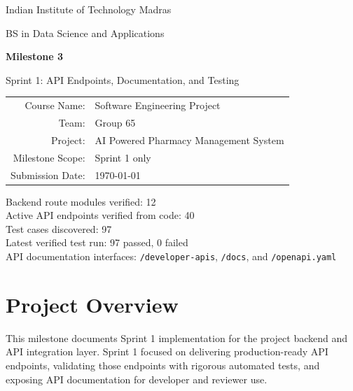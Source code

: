 \documentclass[11pt,a4paper]{article}
\newcommand{\apipath}[1]{\texttt{#1}}
\begin{document}
\begin{titlepage}
  \centering
  {\Large Indian Institute of Technology Madras \par}
  \vspace{0.25cm}
  {\large BS in Data Science and Applications \par}
  \vspace{0.8cm}

  {\LARGE\bfseries Milestone 3 \par}
  \vspace{0.25cm}
  {\large Sprint 1: API Endpoints, Documentation, and Testing \par}
  \vspace{1.0cm}

  \begin{tabular}{rl}
    Course Name: & Software Engineering Project \\
    Team: & Group 65 \\
    Project: & AI Powered Pharmacy Management System \\
    Milestone Scope: & Sprint 1 only \\
    Submission Date: & \today
  \end{tabular}

  \vspace{1.0cm}
  \begin{tcolorbox}[colback=blue!4,colframe=brand,title=Sprint 1 Snapshot]
    Backend route modules verified: 12 \\
    Active API endpoints verified from code: 40 \\
    Test cases discovered: 97 \\
    Latest verified test run: 97 passed, 0 failed \\
    API documentation interfaces: \apipath{/developer-apis}, \apipath{/docs}, and \apipath{/openapi.yaml}
  \end{tcolorbox}
\end{titlepage}

\tableofcontents
\newpage

\section{Project Overview}
This milestone documents Sprint 1 implementation for the project backend and API integration layer. Sprint 1 focused on delivering production-ready API endpoints, validating those endpoints with rigorous automated tests, and exposing API documentation for developer and reviewer use.
\end{document}
